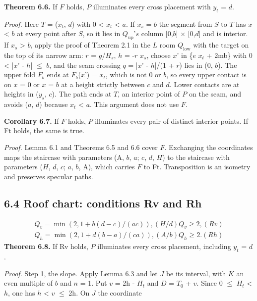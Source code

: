 \documentclass[11pt]{article}
\begin{document}
\textbf{Theorem 6.6.} If \(F\) holds, \(P\) illuminates every cross placement with \(y_{t}\) = \(d\).

\emph{Proof.} Here \(T\) = (\(x_{t}\), \(d\)) with 0 < \(x_{t}\) < \(a\). If \(x_{s}\) = \(b\) the segment from \(S\) to \(T\) has \(x\) < \(b\) at every point after \(S\), so it lies in \(Q_{\mathrm{up}}\)'\(s\) column [0,\(b\)] \(\times\) [0,\(d\)] and is interior. If \(x_{s}\) > \(b\), apply the proof of Theorem 2.1 in the \(L\) room \(Q_{\mathrm{low}}\) with the target on the top of its narrow arm: \(r\) = \(g\)/\(H_{s}\), \(h\) = -\(r\) \(x_{s}\), choose \(x\)' in \{\(e\) \(x_{t}\) + 2mb\} with 0 < |\(x\)' - \(h\)| \(\le\) \(b\), and the seam crossing \(q\) = |\(x\)' - \(h\)|/(1 + \(r\)) lies in (0, \(b\)). The upper fold \(F_{b}\) ends at \(F_{b}\)(\(x\)') = \(x_{t}\), which is not 0 or \(b\), so every upper contact is on \(x\) = 0 or \(x\) = \(b\) at a height strictly between \(c\) and \(d\). Lower contacts are at heights in (\(y_{s}\), \(c\)). The path ends at \(T\), an interior point of \(P\) on the seam, and avoids (\(a\), \(d\)) because \(x_{t}\) < \(a\). This argument does not use \(F\).

\textbf{Corollary 6.7.} If \(F\) holds, \(P\) illuminates every pair of distinct interior points. If Ft holds, the same is true.

\emph{Proof.} Lemma 6.1 and Theorems 6.5 and 6.6 cover \(F\). Exchanging the coordinates maps the staircase with parameters (A, \(b\), \(a\); \(c\), \(d\), \(H\)) to the staircase with parameters (\(H\), \(d\), \(c\); \(a\), \(b\), A), which carries \(F\) to Ft. Transposition is an isometry and preserves specular paths.

\subsection*{6.4 Roof chart: conditions Rv and Rh}
\begin{gather*}
Q_{v} = \min(2, 1 + b(d - c)/(ac)),   (H/d) Q_{v} \ge  2,                  (Rv) \\
Q_{h} = \min(2, 1 + d(b - a)/(ca)),   (A/b) Q_{h} \ge  2.                  (Rh)
\end{gather*}
\textbf{Theorem 6.8.} If Rv holds, \(P\) illuminates every cross placement, including \(y_{t}\) = \(d\).

\emph{Proof.} Step 1, the slope. Apply Lemma 6.3 and let \(J\) be its interval, with \(K\) an even multiple of \(b\) and \(n\) = 1. Put \(v\) = 2h - \(H_{t}\) and \(D\) = \(T_{0}\) + \(v\). Since 0 \(\le\) \(H_{t}\) < \(h\), one has \(h\) < \(v\) \(\le\) 2h. On \(J\) the coordinate
\end{document}

